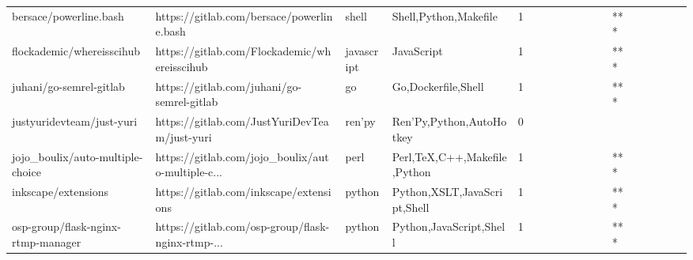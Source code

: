 \begin{tabular}{llllrlllllllllllll}
bersace/powerline.bash                             &          https://gitlab.com/bersace/powerline.bash &             shell &                              Shell,Python,Makefile &       1 &         &        &           &                &                 &        &           &       *** &          &          &       &              &          \\
flockademic/whereisscihub                          &       https://gitlab.com/Flockademic/whereisscihub &        javascript &                                         JavaScript &       1 &         &        &           &                &                 &        &           &       *** &          &          &       &              &          \\
juhani/go-semrel-gitlab                            &         https://gitlab.com/juhani/go-semrel-gitlab &                go &                                Go,Dockerfile,Shell &       1 &         &        &           &                &                 &        &           &       *** &          &          &       &              &          \\
justyuridevteam/just-yuri                          &       https://gitlab.com/JustYuriDevTeam/just-yuri &            ren'py &                           Ren'Py,Python,AutoHotkey &       0 &         &        &           &                &                 &        &           &           &          &          &       &              &          \\
jojo\_boulix/auto-multiple-choice                   &  https://gitlab.com/jojo\_boulix/auto-multiple-c... &              perl &                       Perl,TeX,C++,Makefile,Python &       1 &         &        &           &                &                 &        &           &       *** &          &          &       &              &          \\
inkscape/extensions                                &             https://gitlab.com/inkscape/extensions &            python &                       Python,XSLT,JavaScript,Shell &       1 &         &        &           &                &                 &        &           &       *** &          &          &       &              &          \\
osp-group/flask-nginx-rtmp-manager                 &  https://gitlab.com/osp-group/flask-nginx-rtmp-... &            python &                            Python,JavaScript,Shell &       1 &         &        &           &                &                 &        &           &       *** &          &          &       &              &          \\

\end{tabular}
